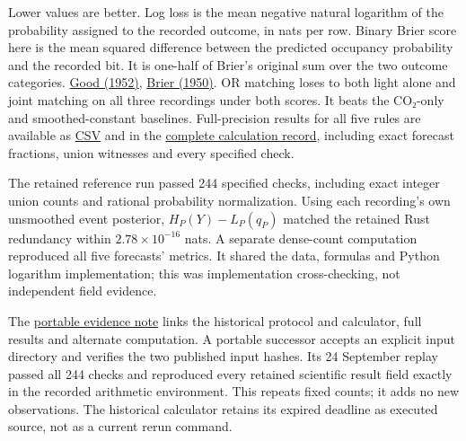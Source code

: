 Lower values are better. Log loss is the mean negative natural logarithm of the probability assigned to the recorded outcome, in nats per row. Binary Brier score here is the mean squared difference between the predicted occupancy probability and the recorded bit. It is one-half of Brier's original sum over the two outcome categories. \href{https://doi.org/10.1111/j.2517-6161.1952.tb00104.x}{Good (1952)}, \href{https://journals.ametsoc.org/view/journals/mwre/78/1/1520-0493_1950_078_0001_vofeit_2_0_co_2.xml}{Brier (1950)}. OR matching loses to both light alone and joint matching on all three recordings under both scores. It beats the CO₂-only and smoothed-constant baselines. Full-precision results for all five rules are available as \href{https://github.com/sepahead/pid-rs/blob/main/audit/evidence/real-occupancy-sensors-example-2026-09-08/or-event-development-2026-09-23/FIVE_RULE_RESULTS.csv}{CSV} and in the \href{https://github.com/sepahead/pid-rs/blob/main/audit/evidence/real-occupancy-sensors-example-2026-09-08/or-event-development-2026-09-23/reference/RESULTS.json}{complete calculation record}, including exact forecast fractions, union witnesses and every specified check.

The retained reference run passed 244 specified checks, including exact integer union counts and rational probability normalization. Using each recording's own unsmoothed event posterior, \(H_P(Y)-L_P(q_P)\) matched the retained Rust redundancy within \(2.78\times10^{-16}\) nats. A separate dense-count computation reproduced all five forecasts' metrics. It shared the data, formulas and Python logarithm implementation; this was implementation cross-checking, not independent field evidence.

The \href{https://github.com/sepahead/pid-rs/blob/main/audit/evidence/real-occupancy-sensors-example-2026-09-08/or-event-development-2026-09-23/EVIDENCE.md}{portable evidence note} links the historical protocol and calculator, full results and alternate computation. A portable successor accepts an explicit input directory and verifies the two published input hashes. Its 24 September replay passed all 244 checks and reproduced every retained scientific result field exactly in the recorded arithmetic environment. This repeats fixed counts; it adds no new observations. The historical calculator retains its expired deadline as executed source, not as a current rerun command.

\par{}

